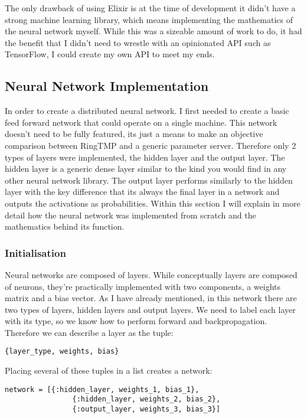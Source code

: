 The only drawback of using Elixir is at the time of development it didn't have a
strong machine learning library, which means implementing the mathematics of the
neural network myself. While this was a sizeable amount of work to do, it had
the benefit that I didn't need to wrestle with an opinionated API such as TensorFlow,
I could create my own API to meet my ends.

\subsection{Neural Network Implementation}
In order to create a distributed neural network. I first needed to create a
basic feed forward network that could operate on a single machine. This network
doesn't need to be fully featured, its just a means to make an objective
comparison between RingTMP and a generic parameter server. Therefore only 2
types of layers were implemented, the hidden layer and the output layer. The
hidden layer is a generic dense layer similar to the kind you would find in any
other neural network library. The output layer performs similarly to the hidden
layer with the key difference that its always the final layer in a network and
outputs the activations as probabilities. Within this section I will explain in
more detail how the neural network was implemented from scratch and the
mathematics behind its function.

\subsubsection{Initialisation}
Neural networks are composed of layers. While conceptually layers are
composed of neurons, they're practically implemented with two components, a
weights matrix and a bias vector. As I have already mentioned, in this network
there are two types of layers, hidden layers and output layers. We need to label
each layer with its type, so we know how to perform forward and
backpropagation. Therefore we can describe a layer as the tuple:
\begin{lstlisting}[numbers=none,frame=none]
    {layer_type, weights, bias}
\end{lstlisting}

Placing several of these tuples in a list creates a network:
\begin{lstlisting}[numbers=none,frame=none]
  network = [{:hidden_layer, weights_1, bias_1},
                {:hidden_layer, weights_2, bias_2},
                {:output_layer, weights_3, bias_3}]
\end{lstlisting}

